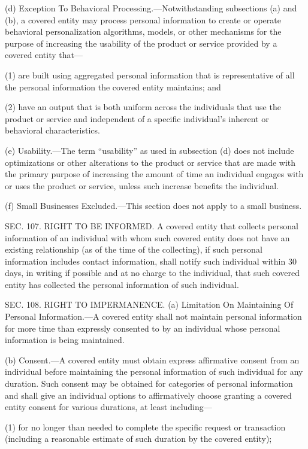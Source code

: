 (d) Exception To Behavioral Processing.—Notwithstanding subsections (a) and (b), a covered entity may process personal information to create or operate behavioral personalization algorithms, models, or other mechanisms for the purpose of increasing the usability of the product or service provided by a covered entity that—

(1) are built using aggregated personal information that is representative of all the personal information the covered entity maintains; and

(2) have an output that is both uniform across the individuals that use the product or service and independent of a specific individual’s inherent or behavioral characteristics.

(e) Usability.—The term “usability” as used in subsection (d) does not include optimizations or other alterations to the product or service that are made with the primary purpose of increasing the amount of time an individual engages with or uses the product or service, unless such increase benefits the individual.

(f) Small Businesses Excluded.—This section does not apply to a small business.


SEC. 107. RIGHT TO BE INFORMED.
A covered entity that collects personal information of an individual with whom such covered entity does not have an existing relationship (as of the time of the collecting), if such personal information includes contact information, shall notify such individual within 30 days, in writing if possible and at no charge to the individual, that such covered entity has collected the personal information of such individual.


SEC. 108. RIGHT TO IMPERMANENCE.
(a) Limitation On Maintaining Of Personal Information.—A covered entity shall not maintain personal information for more time than expressly consented to by an individual whose personal information is being maintained.

(b) Consent.—A covered entity must obtain express affirmative consent from an individual before maintaining the personal information of such individual for any duration. Such consent may be obtained for categories of personal information and shall give an individual options to affirmatively choose granting a covered entity consent for various durations, at least including—

(1) for no longer than needed to complete the specific request or transaction (including a reasonable estimate of such duration by the covered entity);

